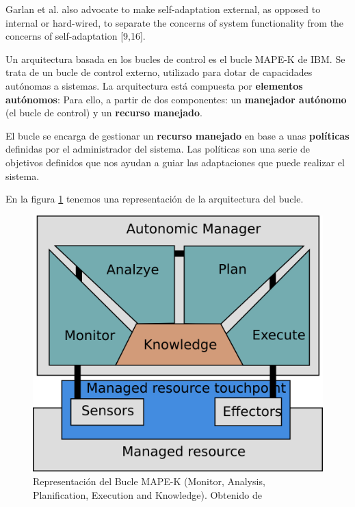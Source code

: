 Garlan et al. also advocate to make self-adaptation external, as opposed to internal or hard-wired, to separate the concerns of system
functionality from the concerns of self-adaptation [9,16].

Un arquitectura basada en los bucles de control es el bucle MAPE-K \cite{ArchitecturalBlueprintAutonomic2006, fonsServiciosAdaptivereadyPara2021} de IBM. Se trata de un bucle de control externo, utilizado para dotar de capacidades autónomas a sistemas. La arquitectura está compuesta por \textbf{elementos autónomos}: Para ello, a partir de dos componentes: un \textbf{manejador autónomo} (el bucle de control) y un \textbf{recurso manejado}.

El bucle se encarga de gestionar un \textbf{recurso manejado} en base a unas \textbf{políticas} definidas por el administrador del sistema. Las políticas son una serie de objetivos definidos que nos ayudan a guiar las adaptaciones que puede realizar el sistema.

En la figura \ref{fig:bucle-mapek} tenemos una representación de la arquitectura del bucle.

\begin{figure}[h]
  \centering
  \includegraphics[scale=1.35]{01_introduccion/images/bucle-mape-k}
  \caption[Representación del Bucle MAPE-K (Monitor, Analysis, Planification, Execution and Knowledge)]{Representación del Bucle MAPE-K (Monitor, Analysis, Planification, Execution and Knowledge). Obtenido de \cite{fonsEspecificacionSistemasAutoadaptativos2021}}
  \label{fig:bucle-mapek}
\end{figure}

